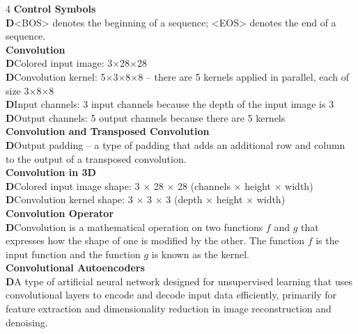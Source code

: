 \documentclass[8pt]{extarticle}
\newcommand{\dtag}{\textcolor{definitioncolor}{\tiny\textbf{D}}\;}
\begin{document}
\begin{multicols}{4}
\vspace{2pt}\textbf{Control Symbols}\\
\dtag <BOS> denotes the beginning of a sequence; <EOS> denotes the end of a sequence.\\
\vspace{2pt}\textbf{Convolution}\\
\dtag Colored input image: 3$\times$28$\times$28\\
\dtag Convolution kernel: 5$\times$3$\times$8$\times$8 -- there are 5 kernels applied in parallel, each of size 3$\times$8$\times$8\\
\dtag Input channels: 3 input channels because the depth of the input image is 3\\
\dtag Output channels: 5 output channels because there are 5 kernels\\
\vspace{2pt}\textbf{Convolution and Transposed Convolution}\\
\dtag Output padding -- a type of padding that adds an additional row and column to the output of a transposed convolution.\\
\vspace{2pt}\textbf{Convolution in 3D}\\
\dtag Colored input image shape: 3 $\times$ 28 $\times$ 28 (channels $\times$ height $\times$ width)\\
\dtag Convolution kernel shape: 3 $\times$ 3 $\times$ 3 (depth $\times$ height $\times$ width)\\
\vspace{2pt}\textbf{Convolution Operator}\\
\dtag Convolution is a mathematical operation on two functions $f$ and $ g$ that expresses how the shape of one is modified by the other. The function $ f$ is the input function and the function $ g$ is known as the kernel.\\
\vspace{2pt}\textbf{Convolutional Autoencoders}\\
\dtag A type of artificial neural network designed for unsupervised learning that uses convolutional layers to encode and decode input data efficiently, primarily for feature extraction and dimensionality reduction in image reconstruction and denoising.\\


\end{multicols}
\end{document}
